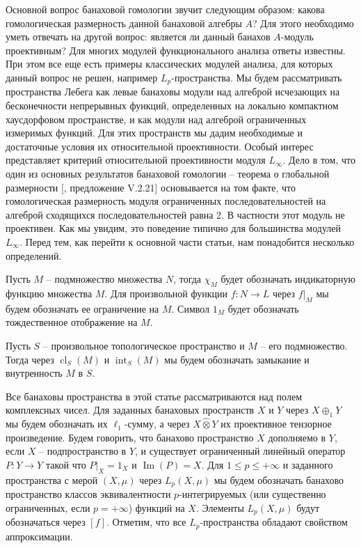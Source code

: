 \documentclass[12pt]{article}
\numberwithin{equation}{subsection}
\theoremstyle{plain}
\newcommand{\projtens}{\mathbin{\widehat{\otimes}}}
\begin{document}
\begin{fulltext}
    Основной вопрос банаховой гомологии звучит следующим образом: какова гомологическая размерность данной банаховой алгебры $A$? Для этого необходимо уметь отвечать на другой вопрос: является ли данный банахов $A$-модуль проективным? Для многих модулей функционального анализа ответы известны. При этом все еще есть примеры классических модулей анализа, для которых данный вопрос не решен, например $L_p$-пространства. Мы будем рассматривать пространства Лебега как левые банаховы модули над алгеброй исчезающих на бесконечности непрерывных функций, определенных на локально компактном хаусдорфовом пространстве, и как модули над алгеброй ограниченных измеримых функций. Для этих пространств мы дадим необходимые и достаточные условия их относительной проективности. Особый интерес представляет критерий относительной проективности модуля $L_\infty$. Дело в том, что один из основных результатов банаховой гомологии -- теорема о глобальной размерности [\cite{HelHomolBanTopAlg}, предложение V.2.21] основывается на том факте, что гомологическая размерность модуля ограниченных последовательностей на алгеброй сходящихся последовательностей равна 2. В частности этот модуль не проективен. Как мы увидим, это поведение типично для большинства модулей $L_\infty$. Перед тем, как перейти к основной части статьи, нам понадобится несколько определений.

    Пусть $M$ -- подмножество множества $N$, тогда $\chi_M$ будет обозначать индикаторную функцию множества $M$. Для произвольной функции $f:N\to L$ через $f|_M$ мы будем обозначать ее ограничение на $M$. Символ $1_M$ будет обозначать тождественное отображение на $M$.

    Пусть $S$ -- произвольное топологическое пространство и $M$ -- его подмножество. Тогда через $\operatorname{cl}_S(M)$ и $\operatorname{int}_S(M)$ мы будем обозначать замыкание и внутренность $M$ в $S$.

    Все банаховы пространства в этой статье рассматриваются над полем комплексных чисел. Для заданных банаховых пространств $X$ и $Y$ через $X\oplus_1 Y$ мы будем обозначать их $\ell_1$-сумму, а через $X\projtens Y$ их проективное тензорное произведение. Будем говорить, что банахово пространство $X$ дополняемо в $Y$, если $X$ -- подпространство в $Y$, и существует ограниченный линейный оператор $P:Y\to Y$ такой что $P|_X=1_X$ и $\operatorname{Im}(P)=X$. Для $1\leq p\leq +\infty$ и заданного пространства с мерой $(X,\mu)$ через $L_p(X,\mu)$ мы будем обозначать банахово пространство классов эквивалентности $p$-интегрируемых (или существенно ограниченных, если $p=+\infty$) функций на $X$. Элементы $L_p(X,\mu)$ будут обозначаться через $[f]$. Отметим, что все $L_p$-пространства обладают свойством аппроксимации.


\end{fulltext}
\end{document}
